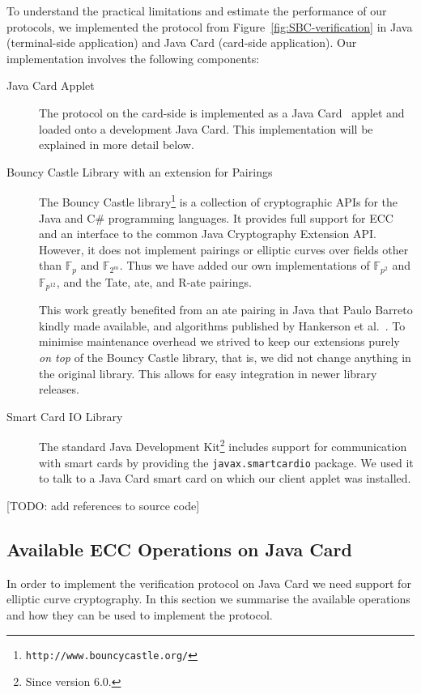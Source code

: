 To understand the practical limitations and estimate the performance of our
protocols, we implemented the protocol from Figure~\ref{fig:SBC-verification}
in Java (terminal-side application) and Java Card (card-side application).
Our implementation involves the following components:
\begin{description}
  \item[Java Card Applet] The protocol on the card-side is implemented as a
    Java Card~\cite{Chen00} applet and loaded onto a development Java Card.
    This implementation will be explained in more detail below.
  \item[Bouncy Castle Library with an extension for Pairings] The Bouncy Castle
    library\footnote{\texttt{http://www.bouncycastle.org/}} is a collection of
    cryptographic APIs for the Java and C\# programming languages. It provides
    full support for ECC and an interface to the common Java Cryptography
    Extension API. However, it does not implement pairings or elliptic curves
    over fields other than $\mathbb{F}_p$ and $\mathbb{F}_{2^m}$. Thus we have
    added our own implementations of $\mathbb{F}_{p^2}$ and
    $\mathbb{F}_{p^{12}}$, and the Tate, ate, and R-ate pairings.

    This work greatly benefited from an ate pairing in Java that Paulo Barreto
    kindly made available, and algorithms published by Hankerson et
    al.~\cite{HankersonMS09}. To minimise maintenance overhead we strived to
    keep our extensions purely \emph{on top} of the Bouncy Castle library, that
    is, we did not change anything in the original library. This allows for easy
    integration in newer library releases.
  \item[Smart Card IO Library] The standard Java Development
    Kit\footnote{Since version 6.0.} includes support for communication with
    smart cards by providing the \texttt{javax.smartcardio} package. We used it
    to talk to a Java Card smart card on which our client applet was installed.
\end{description}

[TODO: add references to source code]

\subsection{Available ECC Operations on Java Card}

In order to implement the verification protocol on Java Card we need support for
elliptic curve cryptography. In this section we summarise the available
operations and how they can be used to implement the protocol.

